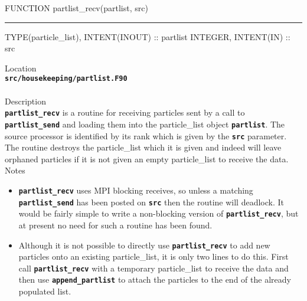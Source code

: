 \documentclass[12pt,a4paper]{article}
\newcommand{\HRule}{\rule[0.3cm]{\linewidth}{0.5mm}}
\newcommand{\inlinecode}[1]{{\color{warwickred} \bf\texttt{#1}}}
\begin{document}
\pagebreak
\begin{codedef}
FUNCTION partlist_recv(partlist, src)
\HRule
TYPE(particle_list), INTENT(INOUT) :: partlist
INTEGER, INTENT(IN) :: src
\end{codedef}
\vspace{1cm}
{\Large Location\\}
\inlinecode{src/housekeeping/partlist.F90}\\
\\[0.5cm]
{\Large Description\\}
\inlinecode{partlist\_recv} is a routine for receiving particles sent by a call
to \inlinecode{partlist\_send} and loading them into the particle\_list object
\inlinecode{partlist}. The source processor is identified by its rank which is
given by the \inlinecode{src} parameter. The routine destroys the particle\_list
which it is given and indeed will leave orphaned particles if it is not given
an empty particle\_list to receive the data.
\\[0.5cm]
{\Large Notes\\}
\begin{itemize}
\item \inlinecode{partlist\_recv} uses MPI blocking receives, so unless a
  matching \inlinecode{partlist\_send} has been posted on \inlinecode{src} then
  the routine will deadlock. It would be fairly simple to write a non-blocking
  version of \inlinecode{partlist\_recv}, but at present no need for such a
  routine has been found.

\item Although it is not possible to directly use \inlinecode{partlist\_recv}
  to add new particles onto an existing particle\_list, it is only two lines to
  do this. First call \inlinecode{partlist\_recv} with a temporary
  particle\_list to receive the data and then use \inlinecode{append\_partlist}
  to attach the particles to the end of the already populated list.
\end{itemize}
\end{document}
